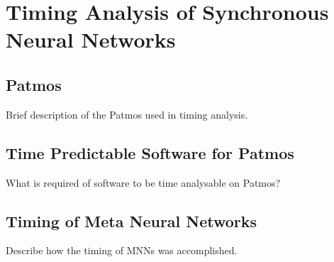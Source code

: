 \section{Timing Analysis of Synchronous Neural Networks}
\subsection{Patmos}
Brief description of the Patmos used in timing analysis.

\subsection{Time Predictable Software for Patmos}
What is required of software to be time analysable on Patmos?



\subsection{Timing of Meta Neural Networks}
Describe how the timing of MNNs was accomplished.